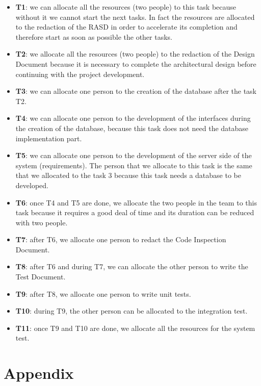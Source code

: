 \documentclass[18pt,oneside,a4paper, titlepage]{article}
\begin{document}
	\begin{itemize}
		\item \textbf{T1}: we can allocate all the resources (two people) to this task because without it we cannot start the next tasks. In fact the resources are allocated to the redaction of the RASD in order to accelerate its completion and therefore start as soon as possible the other tasks.
		\item \textbf{T2}: we allocate all the resources (two people) to the redaction of the Design Document because it is necessary to complete the architectural design before continuing with the project development.
		\item \textbf{T3}: we can allocate one person to the creation of the database after the task T2.
		\item \textbf{T4}: we can allocate one person to the development of the interfaces during the creation of the database, because this task does not need the database implementation part.
		\item \textbf{T5}: we can allocate one person to the development of the server side of the system (requirements). The person that we allocate to this task is the same that we allocated to the task 3 because this task needs a database to be developed.
		\item \textbf{T6}: once T4 and T5 are done, we allocate the two people in the team to this task because it requires a good deal of time and its duration can be reduced with two people.
		\newpage
		\item \textbf{T7}: after T6, we allocate one person to redact the Code Inspection Document.
		\item \textbf{T8}: after T6 and during T7, we can allocate the other person to write the Test Document.
		\item \textbf{T9}: after T8, we allocate one person to write unit tests.
		\item \textbf{T10}: during T9, the other person can be allocated to the integration test.
		\item \textbf{T11}: once T9 and T10 are done, we allocate all the resources for the system test.
	\end{itemize}

\newpage
	
\newpage
\section{Appendix}
\end{document}
